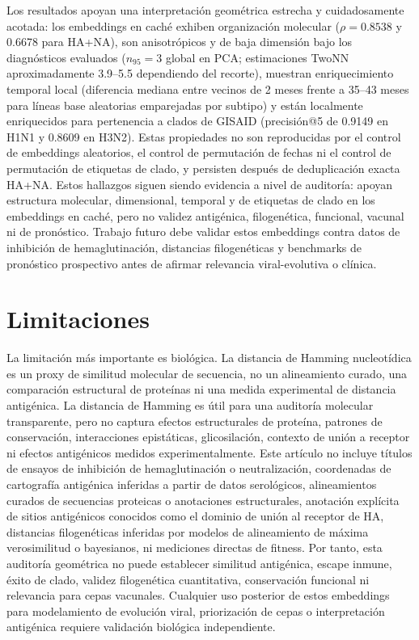 \documentclass[11pt]{article}
\begin{document}
Los resultados apoyan una interpretación geométrica estrecha y cuidadosamente acotada: los embeddings en caché exhiben organización molecular ($\rho=0.8538$ y 0.6678 para HA+NA), son anisotrópicos y de baja dimensión bajo los diagnósticos evaluados ($n_{95}=3$ global en PCA; estimaciones TwoNN aproximadamente 3.9--5.5 dependiendo del recorte), muestran enriquecimiento temporal local (diferencia mediana entre vecinos de 2 meses frente a 35--43 meses para líneas base aleatorias emparejadas por subtipo) y están localmente enriquecidos para pertenencia a clados de GISAID (precisión@5 de 0.9149 en H1N1 y 0.8609 en H3N2). Estas propiedades no son reproducidas por el control de embeddings aleatorios, el control de permutación de fechas ni el control de permutación de etiquetas de clado, y persisten después de deduplicación exacta HA+NA. Estos hallazgos siguen siendo evidencia a nivel de auditoría: apoyan estructura molecular, dimensional, temporal y de etiquetas de clado en los embeddings en caché, pero no validez antigénica, filogenética, funcional, vacunal ni de pronóstico. Trabajo futuro debe validar estos embeddings contra datos de inhibición de hemaglutinación, distancias filogenéticas y benchmarks de pronóstico prospectivo antes de afirmar relevancia viral-evolutiva o clínica.

\section{Limitaciones}

La limitación más importante es biológica. La distancia de Hamming nucleotídica es un proxy de similitud molecular de secuencia, no un alineamiento curado, una comparación estructural de proteínas ni una medida experimental de distancia antigénica. La distancia de Hamming es útil para una auditoría molecular transparente, pero no captura efectos estructurales de proteína, patrones de conservación, interacciones epistáticas, glicosilación, contexto de unión a receptor ni efectos antigénicos medidos experimentalmente. Este artículo no incluye títulos de ensayos de inhibición de hemaglutinación o neutralización, coordenadas de cartografía antigénica inferidas a partir de datos serológicos, alineamientos curados de secuencias proteicas o anotaciones estructurales, anotación explícita de sitios antigénicos conocidos como el dominio de unión al receptor de HA, distancias filogenéticas inferidas por modelos de alineamiento de máxima verosimilitud o bayesianos, ni mediciones directas de fitness. Por tanto, esta auditoría geométrica no puede establecer similitud antigénica, escape inmune, éxito de clado, validez filogenética cuantitativa, conservación funcional ni relevancia para cepas vacunales. Cualquier uso posterior de estos embeddings para modelamiento de evolución viral, priorización de cepas o interpretación antigénica requiere validación biológica independiente.
\end{document}
